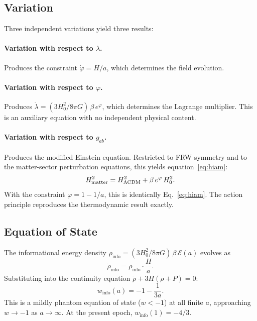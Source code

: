 \documentclass[twocolumn,a4paper,aps,prd,twocolumn,showpacs,notitlepage,superscriptaddress,nofootinbib]{article}
\begin{document}
\subsection{Variation}

Three independent variations yield three results:

\paragraph{Variation with respect to $\lambda$.}
Produces the constraint $\dot{\varphi} = H/a$, which determines the field
evolution.

\paragraph{Variation with respect to $\varphi$.}
Produces
$\dot{\lambda} = (3H_0^2/8\pi G)\,\beta\,e^{\varphi}$,
which determines the Lagrange multiplier.  This is an auxiliary equation
with no independent physical content.

\paragraph{Variation with respect to $g_{ab}$.}
Produces the modified Einstein equation.  Restricted to FRW symmetry and to
the matter-sector perturbation equations, this yields
equation~\eqref{eq:hiam}:
\begin{equation}
H_{\rm matter}^2 = H_{\rm \Lambda CDM}^2 + \beta\,e^{\varphi}\,H_0^2.
\end{equation}
With the constraint $\varphi = 1 - 1/a$, this is identically
Eq.~\eqref{eq:hiam}.  The action principle reproduces the thermodynamic
result exactly.

\subsection{Equation of State}

The informational energy density
$\rho_\mathrm{info} = (3H_0^2/8\pi G)\,\beta\,\mathcal{E}(a)$ evolves as
\begin{equation}
\dot{\rho}_\mathrm{info} = \rho_\mathrm{info}\cdot\frac{H}{a}.
\end{equation}
Substituting into the continuity equation
$\dot{\rho} + 3H(\rho + P) = 0$:
\begin{equation}
w_\mathrm{info}(a) = -1 - \frac{1}{3a}.
\label{eq:w_info}
\end{equation}
This is a mildly phantom equation of state ($w < -1$) at all finite $a$,
approaching $w \to -1$ as $a \to \infty$.  At the present epoch,
$w_\mathrm{info}(1) = -4/3$.
\end{document}

